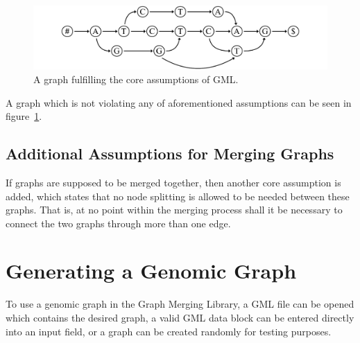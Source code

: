 \documentclass[a4paper,12pt,twoside,BCOR=10mm]{scrbook}
\begin{document}
\begin{figure}[!htb]
\centering
\includegraphics[width=\textwidth]{evo_fig_assume_all_good.pdf}
\caption[Graph fulfilling core assumptions of GML]{A graph fulfilling the core assumptions of GML.} \label{fig:evo_fig_assume_all_good}
\end{figure}

A graph which is not violating any of aforementioned assumptions can be seen in figure~\ref{fig:evo_fig_assume_all_good}.

\subsection{Additional Assumptions for Merging Graphs}

If graphs are supposed to be merged together, then another core assumption is added, 
which states that no node splitting is allowed to be needed between these graphs. 
That is, at no point within the merging process shall it be necessary to 
connect the two graphs through more than one edge.


\section{Generating a Genomic Graph}
%

To use a genomic graph in the Graph Merging Library, 
a GML file can be opened which contains the desired graph, 
a valid GML data block can be entered directly into an input field, 
or a graph can be created randomly for testing purposes.
\end{document}
